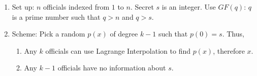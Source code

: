 \begin{mdframed}
\begin{enumerate} 
    \item Set up: $n$ officials indexed from $1$ to $n$. Secret $s$ is an integer. Use $GF(q)$: $q$ is a prime number such that $q > n$ and $q > s$. 
    \item Scheme: Pick a random $p(x)$ of degree $k-1$ such that $p(0) = s$. Thus, 
        \begin{enumerate}
            \item Any $k$ officials can use Lagrange Interpolation to find $p(x)$, therefore $x$. 
            \item Any $k-1$ officials have no information about $s$. 
        \end{enumerate}
\end{enumerate}
\end{mdframed}
